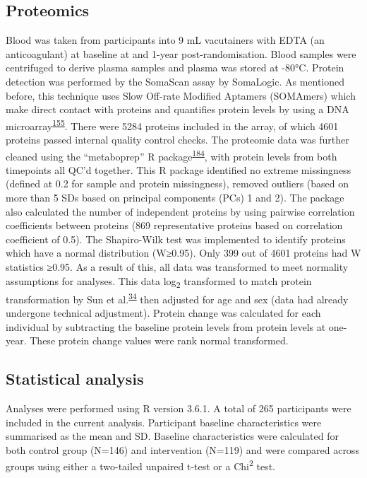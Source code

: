 \documentclass[11pt,twoside]{bristolthesis}
\begin{document}
\hypertarget{proteomics}{%
\subsection{Proteomics}\label{proteomics}}

Blood was taken from participants into 9 mL vacutainers with EDTA (an anticoagulant) at baseline at and 1-year post-randomisation. Blood samples were centrifuged to derive plasma samples and plasma was stored at -80°C. Protein detection was performed by the SomaScan assay by SomaLogic. As mentioned before, this technique uses Slow Off-rate Modified Aptamers (SOMAmers) which make direct contact with proteins and quantifies protein levels by using a DNA microarray\textsuperscript{\protect\hyperlink{ref-Rohloff2014}{155}}. There were 5284 proteins included in the array, of which 4601 proteins passed internal quality control checks. The proteomic data was further cleaned using the ``metaboprep'' R package\textsuperscript{\protect\hyperlink{ref-Hughes2021}{184}}, with protein levels from both timepoints all QC'd together. This R package identified no extreme missingness (defined at 0.2 for sample and protein missingness), removed outliers (based on more than 5 SDs based on principal components (PCs) 1 and 2). The package also calculated the number of independent proteins by using pairwise correlation coefficients between proteins (869 representative proteins based on correlation coefficient of 0.5). The Shapiro-Wilk test was implemented to identify proteins which have a normal distribution (W≥0.95). Only 399 out of 4601 proteins had W statistics ≥0.95. As a result of this, all data was transformed to meet normality assumptions for analyses. This data log\textsubscript{2} transformed to match protein transformation by Sun et al.\textsuperscript{\protect\hyperlink{ref-Sun2018}{34}} then adjusted for age and sex (data had already undergone technical adjustment). Protein change was calculated for each individual by subtracting the baseline protein levels from protein levels at one-year. These protein change values were rank normal transformed.

\hypertarget{statistical-analysis-1}{%
\subsection{Statistical analysis}\label{statistical-analysis-1}}

Analyses were performed using R version 3.6.1. A total of 265 participants were included in the current analysis. Participant baseline characteristics were summarised as the mean and SD. Baseline characteristics were calculated for both control group (N=146) and intervention (N=119) and were compared across groups using either a two-tailed unpaired t-test or a Chi\textsuperscript{2} test.
\end{document}
